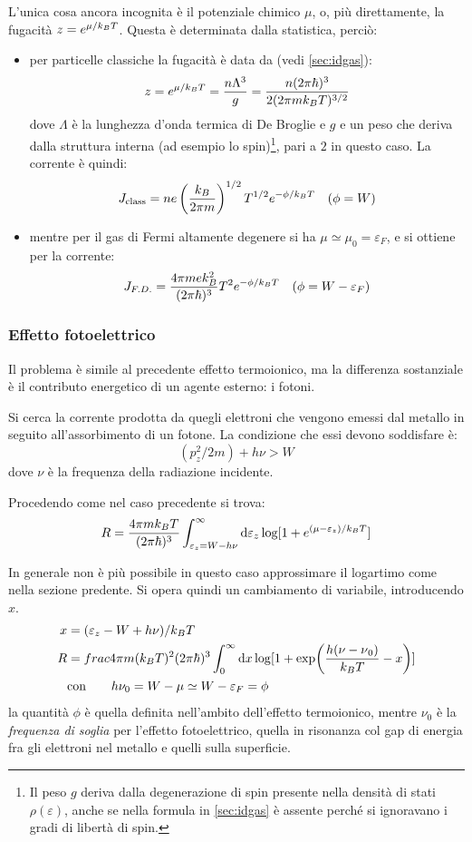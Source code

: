 L'unica cosa ancora incognita è il potenziale chimico $ \mu $, o, più direttamente, la fugacità $ z = e^{\mu/k_B T} $. Questa è determinata dalla statistica, perciò:
\begin{itemize}
	\item per particelle classiche la fugacità è data da (vedi \cref{sec:idgas}):
	\[ z = e^{\mu/k_B T} = \frac{n \Lambda^3}{g} = \frac{n (2\pi \hbar)^3}{2(2\pi m k_B T)^{3/2}} \]
	dove $ \Lambda $ è la lunghezza d'onda termica di De Broglie e $ g $ e un peso che deriva dalla struttura interna (ad esempio lo spin)\footnote{Il peso $ g $ deriva dalla degenerazione di spin presente nella densità di stati $ \rho(\varepsilon) $, anche se nella formula in \cref{sec:idgas} è assente perché si ignoravano i gradi di libertà di spin.}, pari a $ 2 $ in questo caso. La corrente è quindi:
	\[  J_{\text{class}} = ne \left(\frac{k_B}{2\pi m}\right)^{1/2} T^{1/2} e^{-\phi/k_B T} \quad (\phi = W)\]
	\item mentre 
	per il gas di Fermi altamente degenere si ha $ \mu \simeq \mu_0 = \varepsilon_F $, e si ottiene per la corrente:
	\[  J_{F.D.} =  \frac{4\pi m e k_B^2}{(2\pi \hbar)^3} T^2 e^{-\phi/k_B T} \quad (\phi = W - \varepsilon_F)\]
\end{itemize}

\subsubsection{Effetto fotoelettrico}

Il problema è simile al precedente effetto termoionico, ma la differenza sostanziale è il contributo energetico di un agente esterno: i fotoni.

Si cerca la corrente prodotta da quegli elettroni che vengono emessi dal metallo in seguito all'assorbimento di un fotone. La condizione che essi devono soddisfare è:
\[ (p_z^2 / 2m) + h \nu > W \] dove $ \nu $ è la frequenza della radiazione incidente.

Procedendo come nel caso precedente si trova:
\[ R = \frac{4\pi m k_B T}{(2\pi \hbar)^3} \int_{\varepsilon_z = W - h\nu}^{\infty} \dd \varepsilon_z \log[1 + e^{(\mu - \varepsilon_z)/k_B T}]  \]

In generale non è più possibile in questo caso approssimare il logartimo come nella sezione predente. Si opera quindi un cambiamento di variabile, introducendo $ x $.
\begin{align*}
x &= (\varepsilon_z - W + h\nu)/k_B T\\
R &= frac{4\pi m (k_B T)^2}{(2\pi \hbar)^3} \int_{0}^{\infty} \dd x \log[1 + \exp(\frac{h(\nu - \nu{_0})}{k_B T} - x)]\\
&\text{con} \qquad h\nu_0 = W -\mu \simeq W - \varepsilon_F = \phi
\end{align*}
la quantità $ \phi $ è quella definita nell'ambito dell'effetto termoionico, mentre $ \nu_0 $ è la \textit{frequenza di soglia} per l'effetto fotoelettrico, quella in risonanza col gap di energia fra gli elettroni nel metallo e quelli sulla superficie.

